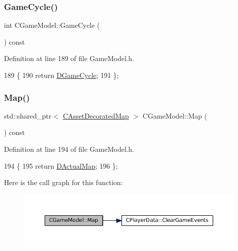 \subsubsection{\texorpdfstring{Game\+Cycle()}{GameCycle()}}
{\footnotesize\ttfamily int C\+Game\+Model\+::\+Game\+Cycle (\begin{DoxyParamCaption}{ }\end{DoxyParamCaption}) const\hspace{0.3cm}{\ttfamily [inline]}}



Definition at line 189 of file Game\+Model.\+h.


\begin{DoxyCode}
189                              \{
190             \textcolor{keywordflow}{return} \hyperlink{classCGameModel_a80bf86a6c1d75229d5d0f441f6313a1c}{DGameCycle};
191         \};
\end{DoxyCode}
\hypertarget{classCGameModel_a7b95d8fb5d96d3dd9ad3596e1a90f6a3}{}\label{classCGameModel_a7b95d8fb5d96d3dd9ad3596e1a90f6a3} 
\subsubsection{\texorpdfstring{Map()}{Map()}}
{\footnotesize\ttfamily std\+::shared\+\_\+ptr$<$ \hyperlink{classCAssetDecoratedMap}{C\+Asset\+Decorated\+Map} $>$ C\+Game\+Model\+::\+Map (\begin{DoxyParamCaption}{ }\end{DoxyParamCaption}) const\hspace{0.3cm}{\ttfamily [inline]}}



Definition at line 194 of file Game\+Model.\+h.


\begin{DoxyCode}
194                                                        \{
195             \textcolor{keywordflow}{return} \hyperlink{classCGameModel_ace04c3b62d6b71e20d1ed5460c0c3cee}{DActualMap};  
196         \};
\end{DoxyCode}
Here is the call graph for this function\+:\nopagebreak
\begin{figure}[H]
\begin{center}
\leavevmode
\includegraphics[width=350pt]{classCGameModel_a7b95d8fb5d96d3dd9ad3596e1a90f6a3_cgraph}
\end{center}
\end{figure}
\hypertarget{classCGameModel_ad9c8def41d5369661fab971b9a4fe786}{}\label{classCGameModel_ad9c8def41d5369661fab971b9a4fe786} 
